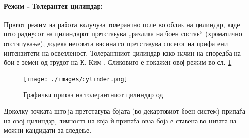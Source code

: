 \documentclass[11pt]{article}
\newcommand\norm[1]{\left\lVert#1\right\rVert}
\renewcommand{\vec}[1]{\mathbf{#1}}
\begin{document}
      \paragraph{Режим - Толерантен цилиндар:\\}
        Првиот режим на работа вклучува толерантно поле во облик на цилиндар, каде што радиусот на цилиндарот претставува „разлика на боен состав“ (хроматично отстапување), додека неговата висина го претставува опсегот на прифатени интензитети на осветленост. Толерантниот цилиндар како начин на споредба на бои е земен од трудот на К. Ким \cite{kim}. Сликовито е покажен овој режим во сл. \ref{fig:cylinder}.
        \begin{figure}[H]
          \centering
          \texttt{[image: ./images/cylinder.png]}
          \caption{Графички приказ на толерантниот цилиндар од \cite{kim}}
          \label{fig:cylinder}
        \end{figure}

        Доколку точката што ја претставува бојата (во декартовиот боен систем) припаѓа на овој цилиндар, личноста на која ѝ припаѓа оваа боја е ставена во низата на можни кандидати за следење.
\end{document}
